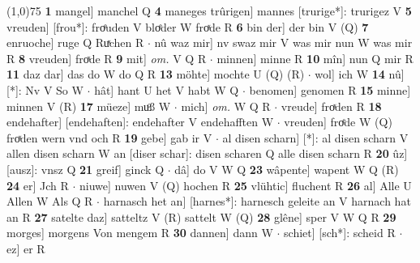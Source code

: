 \documentclass[8pt,a4paper,notitlepage]{article}
\begin{document}
\begin{table}[ht]
\begin{minipage}[t]{0.5\linewidth}
\line(1,0){75} \newline
\textbf{1} mangel] manchel Q \textbf{4} maneges trûrigen] mannes [trurige*]: trurigez V \textbf{5} vreuden] [frou*]: froͤuden V bloͤder W froͯde R \textbf{6} bin der] der bin V (Q) \textbf{7} enruoche] ruge Q Ruͯchen R  $\cdot$ nû waz mir] nv swaz mir V was mir nun W was mir R \textbf{8} vreuden] froͯde R \textbf{9} mit] \textit{om.} V Q R  $\cdot$ minnen] minne R \textbf{10} mîn] nun Q mir R \textbf{11} daz dar] das do W do Q R \textbf{13} möhte] mochte U (Q) (R)  $\cdot$ wol] ich W \textbf{14} nû] [*]: Nv V So W  $\cdot$ hât] hant U het V habt W Q  $\cdot$ benomen] genomen R \textbf{15} minne] minnen V (R) \textbf{17} müeze] muͦß W  $\cdot$ mich] \textit{om.} W Q R  $\cdot$ vreude] froͯden R \textbf{18} endehafter] [endehaften]: endehafter V endehafften W  $\cdot$ vreuden] froͤde W (Q) froͯden wern vnd och R \textbf{19} gebe] gab ir V  $\cdot$ al disen scharn] [*]: al disen scharn V allen disen scharn W an [diser schar]: disen scharen Q alle disen scharn R \textbf{20} ûz] [ausz]: vnsz Q \textbf{21} greif] ginck Q  $\cdot$ dâ] do V W Q \textbf{23} wâpente] wapent W Q (R) \textbf{24} er] Jch R  $\cdot$ niuwe] nuwen V (Q) hochen R \textbf{25} vlühtic] fluchent R \textbf{26} al] Alle U Allen W Als Q R  $\cdot$ harnasch het an] [harnes*]: harnesch geleite an V harnach hat an R \textbf{27} satelte daz] satteltz V (R) sattelt W (Q) \textbf{28} glêne] sper V W Q R \textbf{29} morges] morgens Von mengem R \textbf{30} dannen] dann W  $\cdot$ schiet] [sch*]: scheid R  $\cdot$ ez] er R \newline
\end{minipage}
\end{table}
\end{document}
